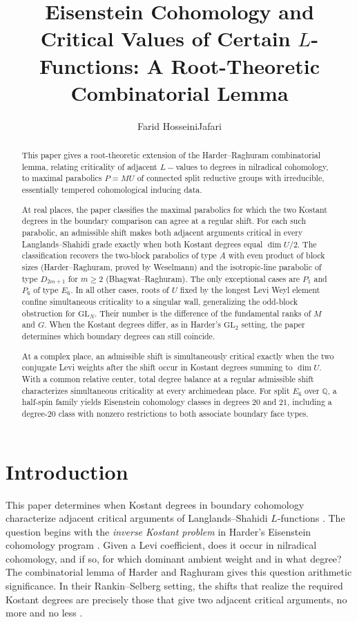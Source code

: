 \documentclass[12pt]{amsart}
\title[A Root-Theoretic Combinatorial Lemma]{Eisenstein Cohomology and Critical Values of Certain \(L\)-Functions: A Root-Theoretic Combinatorial Lemma}
\author{Farid HosseiniJafari}
\date{}
\numberwithin{equation}{section}
\theoremstyle{plain}
\theoremstyle{definition}
\theoremstyle{remark}
\newcommand{\GL}{\mathrm{GL}}
\begin{document}
\begin{abstract}
This paper gives a root-theoretic extension of the Harder--Raghuram combinatorial lemma,  relating criticality of adjacent $L-$values to degrees in nilradical cohomology, to maximal parabolics $P=MU$ of connected split reductive groups with irreducible, essentially tempered cohomological inducing data.

At real places, the paper classifies the maximal parabolics for which the two Kostant degrees in the boundary comparison can agree at a regular shift. For each such parabolic, an admissible shift makes both adjacent arguments critical in every Langlands--Shahidi grade exactly when both Kostant degrees equal $\dim U/2$. The classification recovers the two-block parabolics of type $A$ with even product of block sizes (Harder--Raghuram, proved by Weselmann) and the isotropic-line parabolic of type $D_{2m+1}$ for $m\ge2$ (Bhagwat--Raghuram). The only exceptional cases are $P_1$ and $P_6$ of type $E_6$. In all other cases, roots of $U$ fixed by the longest Levi Weyl element confine simultaneous criticality to a singular wall, generalizing the odd-block obstruction for $\GL_N$. Their number is the difference of the fundamental ranks of $M$ and $G$. When the Kostant degrees differ, as in Harder's $\GL_2$ setting, the paper determines which boundary degrees can still coincide.

At a complex place, an admissible shift is simultaneously critical exactly when the two conjugate Levi weights after the shift occur in Kostant degrees summing to $\dim U$. With a common relative center, total degree balance at a regular admissible shift characterizes simultaneous criticality at every archimedean place. For split $E_6$ over $\mathbb Q$, a half-spin family yields Eisenstein cohomology classes in degrees $20$ and $21$, including a degree-$20$ class with nonzero restrictions to both associate boundary face types.
\end{abstract}
\maketitle

\section{Introduction}\label{sec:introduction}
This paper determines when Kostant degrees in boundary cohomology characterize adjacent critical arguments of Langlands--Shahidi $L$-functions \cite{Shahidi2010}. The question begins with the \emph{inverse Kostant problem} in Harder's Eisenstein cohomology program \cite{HarderBook}. Given a Levi coefficient, does it occur in nilradical cohomology, and if so, for which dominant ambient weight and in what degree? The combinatorial lemma of Harder and Raghuram gives this question arithmetic significance. In their Rankin--Selberg setting, the shifts that realize the required Kostant degrees are precisely those that give two adjacent critical arguments, no more and no less \cite[Lemma~7.14]{HarderRaghuram2020}.
\end{document}
